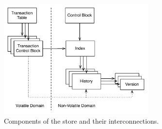 \begin{figure}[!ht]
    \centering
    \includegraphics[width=0.7\textwidth]{figures/concept/store-structure.pdf}
    \caption{Components of the store and their interconnections.}
    \label{fig:concept-struct-complete}
\end{figure}

\vfill

